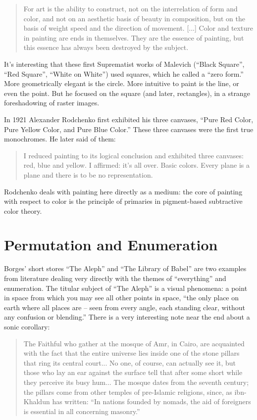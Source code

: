 \documentclass{thesis}
\begin{document}
	\begin{quote}
	For art is the ability to construct, not on the interrelation of form and color, and not on an aesthetic basis of beauty in composition, but on the basis of weight speed and the direction of movement. [...] Color and texture in painting are ends in themselves. They are the essence of painting, but this essence has always been destroyed by the subject.
	\end{quote}
	
	It's interesting that these first Suprematist works of Malevich (``Black Square'', ``Red Square'', ``White on White'') used squares, which he called a ``zero form.'' More geometrically elegant is the circle. More intuitive to paint is the line, or even the point. But he focused on the square (and later, rectangles), in a strange foreshadowing of raster images.
	
	\cite{moma_rodchenko_1998}
	In 1921 Alexander Rodchenko first exhibited his three canvases, ``Pure Red Color, Pure Yellow Color, and Pure Blue Color.'' These three canvases were the first true monochromes. He later said of them:
	
	\begin{quote}
	I reduced painting to its logical conclusion and exhibited three canvases: red, blue and yellow. I affirmed: it's all over. Basic colors. Every plane is a plane and there is to be no representation.
	\end{quote}
	
	Rodchenko deals with painting here directly as a medium: the core of painting with respect to color is the principle of primaries in pigment-based subtractive color theory.
	
\section{Permutation and Enumeration}
	Borges' short stores ``The Aleph''\cite{borges_aleph_2004} and ``The Library of Babel''\cite{borges_library_2000} are two examples from literature dealing very directly with the themes of ``everything'' and enumeration. The titular subject of ``The Aleph'' is a visual phenomena: a point in space from which you may see all other points in space, ``the only place on earth where all places are -- seen from every angle, each standing clear, without any confusion or blending.'' There is a very interesting note near the end about a sonic corollary:
	
	\begin{quote}
	The Faithful who gather at the mosque of Amr, in Cairo, are acquainted with the fact that the entire universe lies inside one of the stone pillars that ring its central court... No one, of course, can actually see it, but those who lay an ear against the surface tell that after some short while they perceive its busy hum... The mosque dates from the seventh century; the pillars come from other temples of pre-Islamic religions, since, as ibn-Khaldun has written: ``In nations founded by nomads, the aid of foreigners is essential in all concerning masonry.''
	\end{quote}
	
\end{document}
